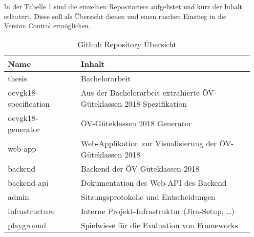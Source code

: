 In der Tabelle \ref{table:github_overview} sind die einzelnen Repositoriers aufgelistet und kurz der Inhalt erläutert.
Diese soll als Übersicht dienen und einen raschen Einstieg in die Version Control ermöglichen.

\begin{table}[H]
    \begin{tabular}{l p{10.6cm}}
        \toprule
        \textbf{Name}           & \textbf{Inhalt}\\
        \midrule
        thesis~\cite{github:thesis}
                                & Bachelorarbeit\\
        oevgk18-specification~\cite{github:oevgk18-specification}
                                & Aus der Bachelorarbeit extrahierte \gls{ÖV-Güteklassen} 2018 Spezifikation\\
        oevgk18-generator~\cite{github:oevgk18-generator}
                                & \gls{ÖV-Güteklassen} 2018 Generator\\
        web-app~\cite{github:web-app}
                                & Web-Applikation zur Visualisierung der \gls{ÖV-Güteklassen} 2018\\
        backend~\cite{github:backend}
                                & Backend der \gls{ÖV-Güteklassen} 2018\\
        backend-api~\cite{github:backend-api}
                                & Dokumentation des Web-\acs{API} des Backend\\
        admin~\cite{github:admin}
                                & Sitzungsprotokolle und Entscheidungen\\
        infrastructure~\cite{github:infrastructure}
                                & Interne Projekt-Infrastruktur (Jira-Setup, \dots)\\  
        playground~\cite{github:playground}
                                & Spielwiese für die Evaluation von Frameworks\\
                                
        \bottomrule
    \end{tabular}
    \caption{Github Repository Übersicht}
    \label{table:github_overview}
\end{table}